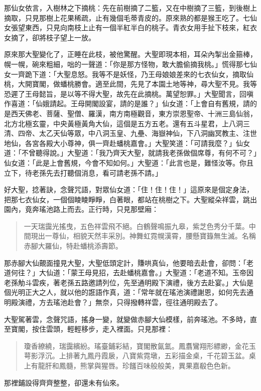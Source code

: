 那仙女依言，入樹林之下摘桃：先在前樹摘了二籃，又在中樹摘了三籃，到後樹上摘取，只見那樹上花果稀疏，止有幾個毛蒂青皮的。原來熟的都是猴王吃了。七仙女張望東西，只見向南枝上止有一個半紅半白的桃子。青衣女用手扯下枝來，紅衣女摘了，卻將枝子望上一放。

原來那大聖變化了，正睡在此枝，被他驚醒。大聖即現本相，耳朵內掣出金箍棒，幌一幌，碗來粗細，咄的一聲道：「你是那方怪物，敢大膽偷摘我桃。」慌得那七仙女一齊跪下道：「大聖息怒。我等不是妖怪，乃王母娘娘差來的七衣仙女，摘取仙桃，大開寶閣，做蟠桃勝會。適至此間，先見了本園土地等神，尋大聖不見。我等恐遲了王母懿旨，是以等不得大聖，故先在此摘桃。萬望恕罪。」大聖聞言，回嗔作喜道：「仙娥請起。王母開閣設宴，請的是誰？」仙女道：「上會自有舊規，請的是西天佛老、菩薩、聖僧、羅漢，南方南極觀音，東方崇恩聖帝、十洲三島仙翁，北方北極玄靈，中央黃極黃角大仙，這個是五方五老。還有五斗星君，上八洞三清、四帝、太乙天仙等眾，中八洞玉皇、九壘、海嶽神仙，下八洞幽冥教主、注世地仙，各宮各殿大小尊神，俱一齊赴蟠桃嘉會。」大聖笑道：「可請我麼？」仙女道：「不曾聽得說。」大聖道：「我乃齊天大聖，就請我老孫做個席尊，有何不可？」仙女道：「此是上會舊規，今會不知如何。」大聖道：「此言也是，難怪汝等。你且立下，待老孫先去打聽個消息，看可請老孫不請。」

好大聖，捻著訣，念聲咒語，對眾仙女道：「住！住！住！」這原來是個定身法，把那七衣仙女，一個個睖睖睜睜，白著眼，都站在桃樹之下。大聖縱朵祥雲，跳出園內，竟奔瑤池路上而去。正行時，只見那壁廂：
\begin{quote}
一天瑞靄光搖曳，五色祥雲飛不絕。白鶴聲鳴振九皋，紫芝色秀分千葉。中間現出一尊仙，相貌天然丰采別。神舞虹霓幌漢霄，腰懸寶籙無生滅。名稱赤腳大羅仙，特赴蟠桃添壽節。
\end{quote}

那赤腳大仙覿面撞見大聖，大聖低頭定計，賺哄真仙，他要暗去赴會，卻問：「老道何往？」大仙道：「蒙王母見招，去赴蟠桃嘉會。」大聖道：「老道不知。玉帝因老孫觔斗雲疾，著老孫五路邀請列位，先至通明殿下演禮，後方去赴宴。」大仙是個光明正大之人，就以他的誑語作真，道：「常年就在瑤池演禮謝恩，如何先去通明殿演禮，方去瑤池赴會？」無奈，只得撥轉祥雲，徑往通明殿去了。

大聖駕著雲，念聲咒語，搖身一變，就變做赤腳大仙模樣，前奔瑤池。不多時，直至寶閣，按住雲頭，輕輕移步，走入裡面。只見那裡：
\begin{quote}
瓊香繚繞，瑞靄繽紛。瑤臺鋪彩結，寶閣散氤氳。鳳翥鸞翔形縹緲，金花玉萼影浮沉。上排著九鳳丹霞扆，八寶紫霓墩，五彩描金桌，千花碧玉盆。桌上有龍肝和鳳髓，熊掌與猩唇。珍饈百味般般美，異果嘉殽色色新。
\end{quote}

那裡鋪設得齊齊整整，卻還未有仙來。

